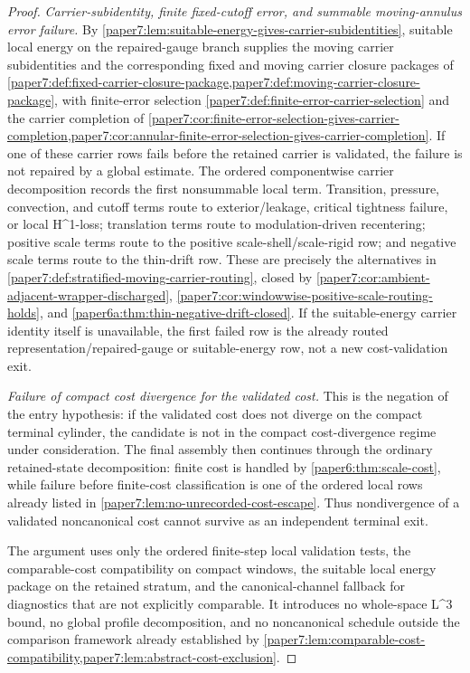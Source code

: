 \documentclass[11pt]{amsart}
\def\({}%
\def\){}%
\theoremstyle{plain}
\theoremstyle{definition}
\theoremstyle{remark}
\begin{document}
\begin{proof}
\emph{Carrier-subidentity, finite fixed-cutoff error, and summable
moving-annulus error failure.}  By
\cref{paper7:lem:suitable-energy-gives-carrier-subidentities}, suitable
local energy on the repaired-gauge branch supplies the moving carrier
subidentities and the corresponding fixed and moving carrier closure
packages of
\cref{paper7:def:fixed-carrier-closure-package,paper7:def:moving-carrier-closure-package},
with finite-error selection
\cref{paper7:def:finite-error-carrier-selection} and the carrier
completion of
\cref{paper7:cor:finite-error-selection-gives-carrier-completion,paper7:cor:annular-finite-error-selection-gives-carrier-completion}.
If one of these carrier rows fails before the retained carrier is validated,
the failure is not repaired by a global estimate.  The ordered componentwise
carrier decomposition records the first nonsummable local term.  Transition,
pressure, convection, and cutoff terms route to exterior/leakage, critical
tightness failure, or local \(H^1\)-loss; translation terms route to
modulation-driven recentering; positive scale terms route to the positive
scale-shell/scale-rigid row; and negative scale terms route to the thin-drift
row.  These are precisely the alternatives in
\cref{paper7:def:stratified-moving-carrier-routing}, closed by
\cref{paper7:cor:ambient-adjacent-wrapper-discharged},
\cref{paper7:cor:windowwise-positive-scale-routing-holds}, and
\cref{paper6a:thm:thin-negative-drift-closed}.  If the suitable-energy
carrier identity itself is unavailable, the first failed row is the already
routed representation/repaired-gauge or suitable-energy row, not a new
cost-validation exit.

\emph{Failure of compact cost divergence for the validated cost.}  This is
the negation of the entry hypothesis: if the validated cost does not
diverge on the compact terminal cylinder, the candidate is not in the
compact cost-divergence regime under consideration.  The final assembly then
continues through the ordinary retained-state decomposition: finite cost is
handled by \cref{paper6:thm:scale-cost}, while failure before finite-cost
classification is one of the ordered local rows already listed in
\cref{paper7:lem:no-unrecorded-cost-escape}.  Thus nondivergence of a
validated noncanonical cost cannot survive as an independent terminal exit.

\smallskip
The argument uses only the ordered finite-step local validation tests, the
comparable-cost compatibility on compact windows, the suitable
local energy package on the retained stratum, and the canonical-channel
fallback for diagnostics that are not explicitly comparable.  It introduces no whole-space
\(L^3\) bound, no global profile decomposition, and no noncanonical
schedule outside the comparison framework already established by
\cref{paper7:lem:comparable-cost-compatibility,paper7:lem:abstract-cost-exclusion}.
\end{proof}
\end{document}
